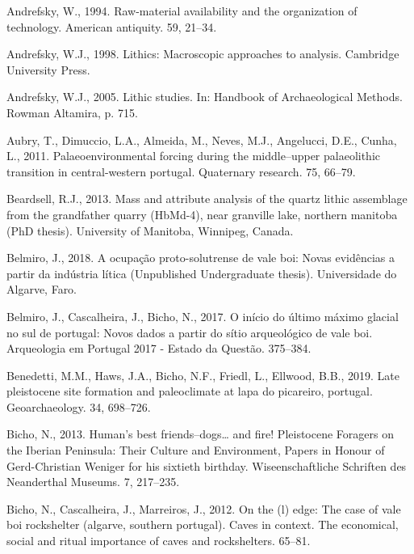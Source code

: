 \documentclass[12pt,twoside]{reedthesis}
\begin{document}
\leavevmode\hypertarget{ref-andrefsky1994}{}%
Andrefsky, W., 1994. Raw-material availability and the organization of technology. American antiquity. 59, 21--34.

\leavevmode\hypertarget{ref-andrefsky1998}{}%
Andrefsky, W.J., 1998. Lithics: Macroscopic approaches to analysis. Cambridge University Press.

\leavevmode\hypertarget{ref-andrefsky2005}{}%
Andrefsky, W.J., 2005. Lithic studies. In: Handbook of Archaeological Methods. Rowman Altamira, p. 715.

\leavevmode\hypertarget{ref-aubryetal2011}{}%
Aubry, T., Dimuccio, L.A., Almeida, M., Neves, M.J., Angelucci, D.E., Cunha, L., 2011. Palaeoenvironmental forcing during the middle--upper palaeolithic transition in central-western portugal. Quaternary research. 75, 66--79.

\leavevmode\hypertarget{ref-beardsell2013}{}%
Beardsell, R.J., 2013. Mass and attribute analysis of the quartz lithic assemblage from the grandfather quarry (HbMd-4), near granville lake, northern manitoba (PhD thesis). University of Manitoba, Winnipeg, Canada.

\leavevmode\hypertarget{ref-belmiro2018}{}%
Belmiro, J., 2018. A ocupação proto-solutrense de vale boi: Novas evidências a partir da indústria lítica (Unpublished Undergraduate thesis). Universidade do Algarve, Faro.

\leavevmode\hypertarget{ref-belmiro2017}{}%
Belmiro, J., Cascalheira, J., Bicho, N., 2017. O início do último máximo glacial no sul de portugal: Novos dados a partir do sítio arqueológico de vale boi. Arqueologia em Portugal 2017 - Estado da Questão. 375--384.

\leavevmode\hypertarget{ref-benedettietal2019}{}%
Benedetti, M.M., Haws, J.A., Bicho, N.F., Friedl, L., Ellwood, B.B., 2019. Late pleistocene site formation and paleoclimate at lapa do picareiro, portugal. Geoarchaeology. 34, 698--726.

\leavevmode\hypertarget{ref-bicho2013}{}%
Bicho, N., 2013. Human's best friends--dogs\ldots{} and fire! Pleistocene Foragers on the Iberian Peninsula: Their Culture and Environment, Papers in Honour of Gerd-Christian Weniger for his sixtieth birthday. Wiseenschaftliche Schriften des Neanderthal Museums. 7, 217--235.

\leavevmode\hypertarget{ref-bichoetal2012}{}%
Bicho, N., Cascalheira, J., Marreiros, J., 2012. On the (l) edge: The case of vale boi rockshelter (algarve, southern portugal). Caves in context. The economical, social and ritual importance of caves and rockshelters. 65--81.
\end{document}
